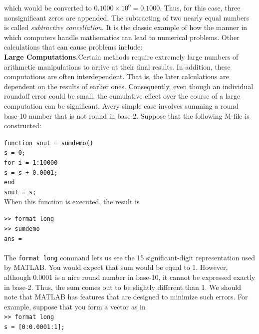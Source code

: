 \documentclass[../main.tex]{subfiles}
\begin{document}
\noindent
which would be converted to $0.1000 \times 10^0 = 0.1000$. Thus, for this case, three nonsignificant
zeros are appended.
The subtracting of two nearly equal numbers is called \emph{subtractive cancellation}. It is
the classic example of how the manner in which computers handle mathematics can lead to
numerical problems. Other calculations that can cause problems include:\\

\noindent
\textbf{Large Computations.}\quad Certain methods require extremely large numbers of arithmetic
manipulations to arrive at their final results. In addition, these computations are often interdependent.
That is, the later calculations are dependent on the results of earlier ones. Consequently,
even though an individual roundoff error could be small, the cumulative effect
over the course of a large computation can be significant. Avery simple case involves summing
a round base-10 number that is not round in base-2. Suppose that the following M-file
is constructed:\\
\vspace{1cm}

\texttt{function sout = sumdemo()\\
\indent s = 0;\\
\indent for i = 1:10000\\
\indent\hspace{5 mm} s = s + 0.0001;\\
\indent end\\
\indent sout = s;}\\

\noindent
When this function is executed, the result is

\texttt{>> format long\\
\indent >> sumdemo\\
\indent ans =\\
\indent{}}\\

The \texttt{format long} command lets us see the 15 significant-digit representation used
by MATLAB. You would expect that sum would be equal to 1. However, although
0.0001 is a nice round number in base-10, it cannot be expressed exactly in base-2. Thus,
the sum comes out to be slightly different than 1. We should note that MATLAB has features
that are designed to minimize such errors. For example, suppose that you form a
vector as in\\

\texttt{>> format long\\
\indent s = [0:0.0001:1];}\\
\end{document}
